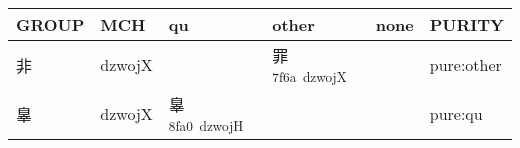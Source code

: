 \documentclass[14pt,a4paper]{scrartcl}
\begin{document}
\begin{longtable}[c]{@{}llllll@{}}
\toprule
\begin{minipage}[b]{0.14\columnwidth}\raggedright\strut
GROUP
\strut\end{minipage} &
\begin{minipage}[b]{0.14\columnwidth}\raggedright\strut
MCH
\strut\end{minipage} &
\begin{minipage}[b]{0.14\columnwidth}\raggedright\strut
qu
\strut\end{minipage} &
\begin{minipage}[b]{0.14\columnwidth}\raggedright\strut
other
\strut\end{minipage} &
\begin{minipage}[b]{0.14\columnwidth}\raggedright\strut
none
\strut\end{minipage} &
\begin{minipage}[b]{0.14\columnwidth}\raggedright\strut
PURITY
\strut\end{minipage}\tabularnewline
\midrule
\endhead
\begin{minipage}[t]{0.14\columnwidth}\raggedright\strut
非
\strut\end{minipage} &
\begin{minipage}[t]{0.14\columnwidth}\raggedright\strut
dzwojX
\strut\end{minipage} &
\begin{minipage}[t]{0.14\columnwidth}\raggedright\strut
\strut\end{minipage} &
\begin{minipage}[t]{0.14\columnwidth}\raggedright\strut
罪\textsuperscript{7f6a~dzwojX}
\strut\end{minipage} &
\begin{minipage}[t]{0.14\columnwidth}\raggedright\strut
\strut\end{minipage} &
\begin{minipage}[t]{0.14\columnwidth}\raggedright\strut
pure:other
\strut\end{minipage}\tabularnewline
\begin{minipage}[t]{0.14\columnwidth}\raggedright\strut
辠
\strut\end{minipage} &
\begin{minipage}[t]{0.14\columnwidth}\raggedright\strut
dzwojX
\strut\end{minipage} &
\begin{minipage}[t]{0.14\columnwidth}\raggedright\strut
辠\textsuperscript{8fa0~dzwojH}
\strut\end{minipage} &
\begin{minipage}[t]{0.14\columnwidth}\raggedright\strut
\strut\end{minipage} &
\begin{minipage}[t]{0.14\columnwidth}\raggedright\strut
\strut\end{minipage} &
\begin{minipage}[t]{0.14\columnwidth}\raggedright\strut
pure:qu
\strut\end{minipage}\tabularnewline
\bottomrule
\end{longtable}
\end{document}
